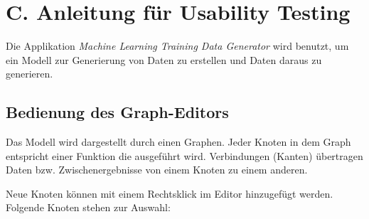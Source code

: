 \section*{C. Anleitung für Usability Testing}
Die Applikation \textit{Machine Learning Training Data Generator} wird benutzt, um ein Modell zur Generierung von Daten zu erstellen und Daten daraus zu generieren.

\subsection*{Bedienung des Graph-Editors}

Das Modell wird dargestellt durch einen Graphen. Jeder Knoten in dem Graph entspricht einer Funktion die ausgeführt wird. Verbindungen (Kanten) übertragen Daten bzw. Zwischenergebnisse von einem Knoten zu einem anderen.


Neue Knoten können mit einem Rechtsklick im Editor hinzugefügt werden. Folgende Knoten stehen zur Auswahl:

